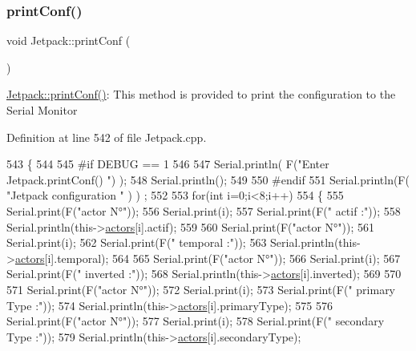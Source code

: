 \subsubsection{\texorpdfstring{print\+Conf()}{printConf()}}
{\footnotesize\ttfamily void Jetpack\+::print\+Conf (\begin{DoxyParamCaption}{ }\end{DoxyParamCaption})}

\hyperlink{class_jetpack_ac54a7bb4f9166bee32052253d9b1d306}{Jetpack\+::print\+Conf()}\+: This method is provided to print the configuration to the Serial Monitor 

Definition at line 542 of file Jetpack.\+cpp.


\begin{DoxyCode}
543 \{
544 
545 \textcolor{preprocessor}{#if DEBUG == 1 }
546 
547     Serial.println( F(\textcolor{stringliteral}{"Enter Jetpack.printConf() "}) );
548     Serial.println();
549 
550 \textcolor{preprocessor}{#endif }
551     Serial.println(F( \textcolor{stringliteral}{"Jetpack configuration "} ) ) ;
552  
553         \textcolor{keywordflow}{for}(\textcolor{keywordtype}{int} i=0;i<8;i++)
554     \{   
555         Serial.print(F(\textcolor{stringliteral}{"actor N°"}));
556         Serial.print(i);
557         Serial.print(F(\textcolor{stringliteral}{" actif :"}));
558         Serial.println(this->\hyperlink{class_jetpack_a7e16d2f97837f9712a2e6de1c50d99db}{actors}[i].actif);
559         
560         Serial.print(F(\textcolor{stringliteral}{"actor N°"}));
561         Serial.print(i);
562         Serial.print(F(\textcolor{stringliteral}{" temporal :"}));
563         Serial.println(this->\hyperlink{class_jetpack_a7e16d2f97837f9712a2e6de1c50d99db}{actors}[i].temporal);
564 
565         Serial.print(F(\textcolor{stringliteral}{"actor N°"}));
566         Serial.print(i);
567         Serial.print(F(\textcolor{stringliteral}{" inverted :"}));
568         Serial.println(this->\hyperlink{class_jetpack_a7e16d2f97837f9712a2e6de1c50d99db}{actors}[i].inverted);
569 
570 
571         Serial.print(F(\textcolor{stringliteral}{"actor N°"}));
572         Serial.print(i);
573         Serial.print(F(\textcolor{stringliteral}{" primary Type :"}));
574         Serial.println(this->\hyperlink{class_jetpack_a7e16d2f97837f9712a2e6de1c50d99db}{actors}[i].primaryType);
575 
576         Serial.print(F(\textcolor{stringliteral}{"actor N°"}));
577         Serial.print(i);
578         Serial.print(F(\textcolor{stringliteral}{" secondary Type :"}));       
579         Serial.println(this->\hyperlink{class_jetpack_a7e16d2f97837f9712a2e6de1c50d99db}{actors}[i].secondaryType);

\end{DoxyCode}
